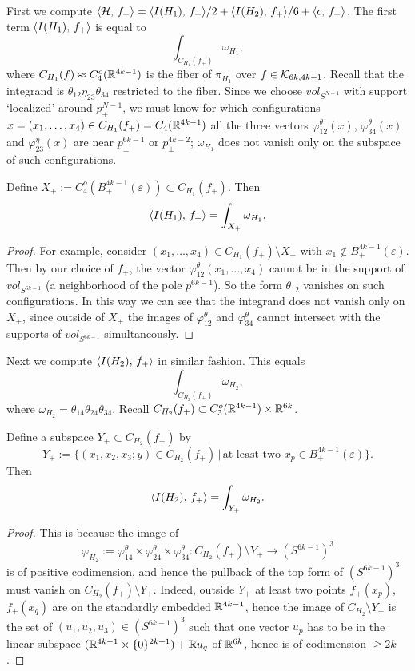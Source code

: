 First we compute $\langle {\mathcal{H}},\, {f_+}\rangle = \langle {I(H_1 )},\, {f_+}\rangle/2 +\langle {I(H_2 )},\, {f_+}\rangle/6 + \langle {c},\, {f_+}\rangle$.
The first term $\langle {I(H_1 )},\, {f_+}\rangle$ is equal to
\[
 \int_{C_{H_1}(f_+ )}\omega_{H_1} ,
\]
where $C_{H_1}(f) \approx C^o_4 (\mathbb{R}^{4k-1})$ is the fiber of $\pi_{H_1}$ over $f \in \mathcal{K}_{6k ,4k-1}$.
Recall that the integrand is $\theta_{12}\eta_{23}\theta_{34}$ restricted to the fiber.
Since we choose $vol_{S^{N-1}}$ with support `localized' around $p^{N-1}_{\pm}$, we must know for which configurations
$x=(x_1 ,\dots ,x_4 ) \in C_{H_1}(f_+ )= C_4 (\mathbb{R}^{4k-1})$ all the three vectors $\varphi^{\theta}_{12}(x)$,
$\varphi^{\theta}_{34}(x)$ and $\varphi^{\eta}_{23}(x)$ are near $p^{6k-1}_{\pm}$ or $p^{4k-2}_{\pm}$;
$\omega_{H_1}$ does not vanish only on the subspace of such configurations.


\begin{lem}\label{lem_localize1}
Define $X_+ := C^o_4 (B^{4k-1}_+ (\varepsilon )) \subset C_{H_1}(f_+ )$.
Then
\[
 \langle {I(H_1 )},\, {f_+}\rangle = \int_{X_+}\omega_{H_1} .
\]
\end{lem}


\begin{proof}
For example, consider $(x_1 ,\dots ,x_4 ) \in C_{H_1}(f_+ ) \setminus X_+ $ with $x_1 \not\in B^{4k-1}_+ (\varepsilon )$.
Then by our choice of $f_+$, the vector $\varphi^{\theta}_{12} (x_1 ,\dots ,x_4 )$ cannot be in the support of
$vol_{S^{6k-1}}$ (a neighborhood of the pole $p^{6k-1}$).
So the form $\theta_{12}$ vanishes on such configurations.
In this way we can see that the integrand does not vanish only on $X_+$, since outside of $X_+$ the images of
$\varphi^{\theta}_{12}$ and $\varphi^{\theta}_{34}$ cannot intersect with the supports of $vol_{S^{6k-1}}$
simultaneously.
\end{proof}


Next we compute $\langle {I(H_2 )},\, {f_+}\rangle$ in similar fashion.
This equals
\[
 \int_{C_{H_2}(f_+ )}\omega_{H_2},
\]
where $\omega_{H_2} = \theta_{14}\theta_{24}\theta_{34}$.
Recall $C_{H_2}(f_+ ) \subset C^o_3 (\mathbb{R}^{4k-1}) \times \mathbb{R}^{6k}$.


\begin{lem}\label{lem_localize2}
Define a subspace $Y_+ \subset C_{H_2}(f_+ )$ by
\[
 Y_+ := \{ (x_1 ,x_2 ,x_3 ;y) \in C_{H_2}(f_+ ) \, | \, \text{at least two }x_p \in B^{4k-1}_+ (\varepsilon )\} .
\]
Then
\[
 \langle {I(H_2 )},\, {f_+}\rangle = \int_{Y_+} \omega_{H_2}.
\]
\end{lem}


\begin{proof}
This is because the image of
\[
 \varphi_{H_2}:= \varphi^{\theta}_{14} \times \varphi^{\theta}_{24} \times \varphi^{\theta}_{34}
 : C_{H_2}(f_+ ) \setminus Y_+ \longrightarrow (S^{6k-1})^3
\]
is of positive codimension, and hence the pullback of the top form of $(S^{6k-1})^3$ must vanish on
$C_{H_2}(f_+ ) \setminus Y_+$.
Indeed, outside $Y_+$ at least two points $f_+ (x_p )$, $f_+ (x_q )$ are on the standardly embedded $\mathbb{R}^{4k-1}$, hence
the image of $C_{H_2}\setminus Y_+$ is the set of $(u_1 ,u_2 ,u_3 ) \in (S^{6k-1})^3$ such that one vector
$u_p$ has to be in the linear subspace $(\mathbb{R}^{4k-1}\times \{ 0 \}^{2k+1})+\mathbb{R} u_q$ of $\mathbb{R}^{6k}$, hence is of
codimension $\ge 2k$.
\end{proof}


